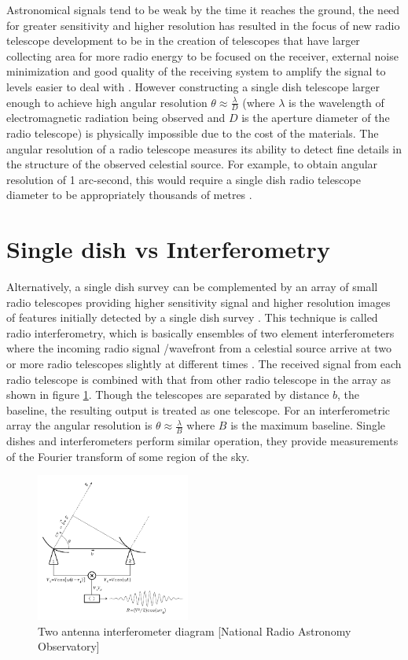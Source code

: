 Astronomical signals tend to be weak by the time it reaches the ground, the need for greater sensitivity and higher resolution has resulted in the focus of new radio telescope development to be in the creation of telescopes that have larger collecting area for more radio energy to be focused on the receiver, external noise minimization and good quality of the receiving system to amplify the signal to levels easier to deal with \citep{verschuur2015invisible}. However constructing a single dish telescope larger enough to achieve high angular resolution $\theta \approx\frac{\lambda}{D}$ (where $\lambda$ is the wavelength of electromagnetic radiation  being observed and $D$ is the aperture diameter of the radio telescope) is physically impossible due to the cost of the materials. The angular resolution of a radio telescope measures its ability to detect fine details in the structure of the observed celestial source. For example, to obtain angular resolution of 1 arc-second, this would require a single dish radio telescope diameter to be appropriately thousands of metres \citep{verschuur2015invisible}. 

\section{Single dish vs Interferometry}
\label{RvI}
Alternatively, a single dish survey can be complemented by an array of small radio telescopes providing higher sensitivity signal and higher resolution images of features initially detected by a single dish survey \citep{wright2004single}. This technique is called radio interferometry, which is basically ensembles of two element interferometers where the incoming radio signal /wavefront from a celestial source arrive at two or more radio telescopes slightly at different times \citep{verschuur2015invisible}. The received signal from each radio telescope is combined with that from other radio telescope in the array as shown in figure \ref{images/Rint.png}. Though the telescopes are separated by distance $b$, the baseline, the resulting output is treated as one telescope. For an interferometric array the angular resolution is $\theta \approx\frac{\lambda}{B}$ where $B$ is the maximum baseline. Single dishes and interferometers  perform similar operation, they provide measurements of the Fourier transform of some region of the sky.

\begin{figure}[h!]
  \centering
    \includegraphics[width=0.45\textwidth]{images/Rint.png}
    \caption{Two antenna interferometer diagram [National Radio Astronomy Observatory]}
  \label{images/Rint.png}
\end{figure}

